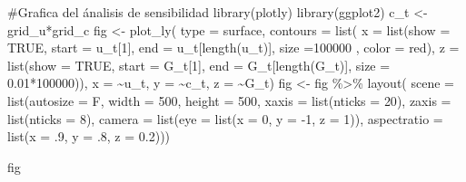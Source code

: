 \documentclass[
  us-letterpaper,
]{scrreprt}
\newenvironment{Shaded}{\begin{snugshade}}{\end{snugshade}}
\newcommand{\AttributeTok}[1]{\textcolor[rgb]{0.40,0.45,0.13}{#1}}
\newcommand{\CommentTok}[1]{\textcolor[rgb]{0.37,0.37,0.37}{#1}}
\newcommand{\ConstantTok}[1]{\textcolor[rgb]{0.56,0.35,0.01}{#1}}
\newcommand{\DecValTok}[1]{\textcolor[rgb]{0.68,0.00,0.00}{#1}}
\newcommand{\FloatTok}[1]{\textcolor[rgb]{0.68,0.00,0.00}{#1}}
\newcommand{\FunctionTok}[1]{\textcolor[rgb]{0.28,0.35,0.67}{#1}}
\newcommand{\NormalTok}[1]{\textcolor[rgb]{0.00,0.23,0.31}{#1}}
\newcommand{\OtherTok}[1]{\textcolor[rgb]{0.00,0.23,0.31}{#1}}
\newcommand{\SpecialCharTok}[1]{\textcolor[rgb]{0.37,0.37,0.37}{#1}}
\newcommand{\StringTok}[1]{\textcolor[rgb]{0.13,0.47,0.30}{#1}}
\theoremstyle{definition}
\theoremstyle{plain}
\theoremstyle{plain}
\theoremstyle{remark}
\begin{document}
\begin{Shaded}
\begin{Highlighting}[]
\CommentTok{\#Grafica del ánalisis de sensibilidad}
\FunctionTok{library}\NormalTok{(plotly)}
\FunctionTok{library}\NormalTok{(ggplot2)}
\NormalTok{c\_t }\OtherTok{\textless{}{-}}\NormalTok{ grid\_u}\SpecialCharTok{*}\NormalTok{grid\_c}
\NormalTok{fig }\OtherTok{\textless{}{-}} \FunctionTok{plot\_ly}\NormalTok{(}
  \AttributeTok{type =} \StringTok{\textquotesingle{}surface\textquotesingle{}}\NormalTok{,}
  \AttributeTok{contours =} \FunctionTok{list}\NormalTok{(}
    \AttributeTok{x =} \FunctionTok{list}\NormalTok{(}\AttributeTok{show =} \ConstantTok{TRUE}\NormalTok{, }\AttributeTok{start =}\NormalTok{ u\_t[}\DecValTok{1}\NormalTok{], }
             \AttributeTok{end =}\NormalTok{ u\_t[}\FunctionTok{length}\NormalTok{(u\_t)], }
             \AttributeTok{size =}\DecValTok{100000}\NormalTok{ , }\AttributeTok{color =} \StringTok{\textquotesingle{}red\textquotesingle{}}\NormalTok{),}
    \AttributeTok{z =} \FunctionTok{list}\NormalTok{(}\AttributeTok{show =} \ConstantTok{TRUE}\NormalTok{, }\AttributeTok{start =}\NormalTok{ G\_t[}\DecValTok{1}\NormalTok{], }
             \AttributeTok{end =}\NormalTok{ G\_t[}\FunctionTok{length}\NormalTok{(G\_t)], }
             \AttributeTok{size =} \FloatTok{0.01}\SpecialCharTok{*}\DecValTok{100000}\NormalTok{)),}
  \AttributeTok{x =} \SpecialCharTok{\textasciitilde{}}\NormalTok{u\_t,}
  \AttributeTok{y =} \SpecialCharTok{\textasciitilde{}}\NormalTok{c\_t,}
  \AttributeTok{z =} \SpecialCharTok{\textasciitilde{}}\NormalTok{G\_t)}
\NormalTok{fig }\OtherTok{\textless{}{-}}\NormalTok{ fig }\SpecialCharTok{\%\textgreater{}\%} \FunctionTok{layout}\NormalTok{(}
  \AttributeTok{scene =} \FunctionTok{list}\NormalTok{(}\AttributeTok{autosize =}\NormalTok{ F, }\AttributeTok{width =} \DecValTok{500}\NormalTok{, }\AttributeTok{height =} \DecValTok{500}\NormalTok{,}
    \AttributeTok{xaxis =} \FunctionTok{list}\NormalTok{(}\AttributeTok{nticks =} \DecValTok{20}\NormalTok{),}
    \AttributeTok{zaxis =} \FunctionTok{list}\NormalTok{(}\AttributeTok{nticks =} \DecValTok{8}\NormalTok{),}
    \AttributeTok{camera =} \FunctionTok{list}\NormalTok{(}\AttributeTok{eye =} \FunctionTok{list}\NormalTok{(}\AttributeTok{x =} \DecValTok{0}\NormalTok{, }
                             \AttributeTok{y =} \SpecialCharTok{{-}}\DecValTok{1}\NormalTok{, }\AttributeTok{z =} \DecValTok{1}\NormalTok{)),}
    \AttributeTok{aspectratio =} \FunctionTok{list}\NormalTok{(}\AttributeTok{x =}\NormalTok{ .}\DecValTok{9}\NormalTok{, }\AttributeTok{y =}\NormalTok{ .}\DecValTok{8}\NormalTok{, }\AttributeTok{z =} \FloatTok{0.2}\NormalTok{)))}

\NormalTok{fig}
\end{Highlighting}
\end{Shaded}
\end{document}
